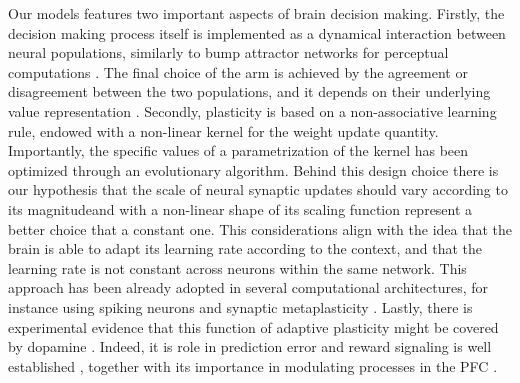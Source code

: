 Our models features two important aspects of brain decision making. Firstly, the decision making process itself is implemented as a dynamical interaction between neural populations, similarly to bump attractor networks for perceptual computations \cite{carrollEncodingCertaintyBump2014, esnaola-acebesBumpAttractorDynamics2021}.
The final choice of the arm is achieved by the agreement or disagreement between the two populations, and it depends on their underlying value representation \cite{bariDynamicDecisionMaking2021, houstonMatchingBehavioursRewards2021}.
Secondly, plasticity is based on a non-associative learning rule, endowed with a non-linear kernel for the weight update quantity.
Importantly, the specific values of a parametrization of the kernel has been optimized through an evolutionary algorithm.
Behind this design choice there is our hypothesis that the scale of neural synaptic updates should vary according to its magnitudeand with a non-linear shape of its scaling function represent a better choice that a constant one.
This considerations align with the idea that the brain is able to adapt its learning rate according to the context, and that the learning rate is not constant across neurons within the same network.
This approach has been already adopted in several computational architectures, for instance using spiking neurons \cite{inglisModulationDopamineAdaptive2021} and synaptic metaplasticity \cite{iigayaAdaptiveLearningDecisionmaking2016}.
Lastly, there is experimental evidence that this function of adaptive plasticity might be covered by dopamine \cite{toblerAdaptiveCodingReward2005}.
Indeed, it is role in prediction error and reward signaling is well established \cite{schultzNeuralSubstratePrediction1997}, together with its importance in modulating processes in the PFC \cite{didomenicoDopaminergicModulationPrefrontal2023, lohaniDopamineModulationPrefrontal2019,
dardenneRolePrefrontalCortex2012}. 
